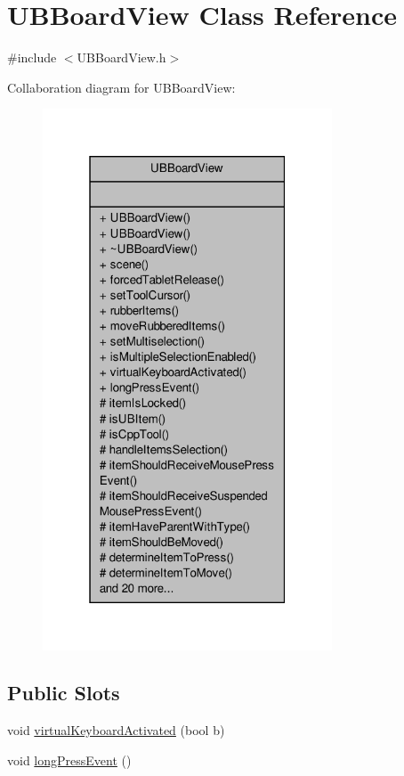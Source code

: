 \hypertarget{class_u_b_board_view}{\section{U\-B\-Board\-View Class Reference}
\label{d1/d78/class_u_b_board_view}
}


{\ttfamily \#include $<$U\-B\-Board\-View.\-h$>$}



Collaboration diagram for U\-B\-Board\-View\-:
\nopagebreak
\begin{figure}[H]
\begin{center}
\leavevmode
\includegraphics[width=244pt]{d8/d63/class_u_b_board_view__coll__graph}
\end{center}
\end{figure}
\subsection*{Public Slots}
\begin{DoxyCompactItemize}
\item 
void \hyperlink{class_u_b_board_view_a2d30679bb82bf535f21be9331b1e2f05}{virtual\-Keyboard\-Activated} (bool b)
\item 
void \hyperlink{class_u_b_board_view_af1ecc328373e86fc00110611606b62e4}{long\-Press\-Event} ()
\end{DoxyCompactItemize}
